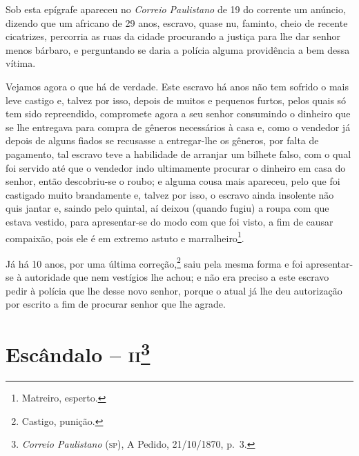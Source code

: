 Sob esta epígrafe apareceu no \emph{Correio Paulistano} de 19 do
corrente um anúncio, dizendo que um africano de 29 anos, escravo, quase
nu, faminto, cheio de recente cicatrizes, percorria as ruas da cidade
procurando a justiça para lhe dar senhor menos bárbaro, e perguntando se
daria a polícia alguma providência a bem dessa vítima.

Vejamos agora o que há de verdade. Este escravo há anos não tem sofrido
o mais leve castigo e, talvez por isso, depois de muitos e pequenos
furtos, pelos quais só tem sido repreendido, compromete agora a seu
senhor consumindo o dinheiro que se lhe entregava para compra de gêneros
necessários à casa e, como o vendedor já depois de alguns fiados se
recusasse a entregar-lhe os gêneros, por falta de pagamento, tal escravo
teve a habilidade de arranjar um bilhete falso, com o qual foi servido
até que o vendedor indo ultimamente procurar o dinheiro em casa do
senhor, então descobriu-se o roubo; e alguma cousa mais apareceu, pelo
que foi castigado muito brandamente e, talvez por isso, o escravo ainda
insolente não quis jantar e, saindo pelo quintal, aí deixou (quando
fugiu) a roupa com que estava vestido, para apresentar-se do modo com
que foi visto, a fim de causar compaixão, pois ele é em extremo astuto e
marralheiro\footnote{ Matreiro, esperto.}.

Já há 10 anos, por uma última correção,\footnote{ Castigo, punição.}
saiu pela mesma forma e foi apresentar-se à autoridade que nem vestígios
lhe achou; e não era preciso a este escravo pedir à polícia que lhe
desse novo senhor, porque o atual já lhe deu autorização por escrito a
fim de procurar senhor que lhe agrade.

\asterisc{}

\chapter{Escândalo -- \textsc{ii}\footnote{\emph{Correio Paulistano} (\textsc{sp}), A Pedido, 21/10/1870,
  p.~3.}} %

